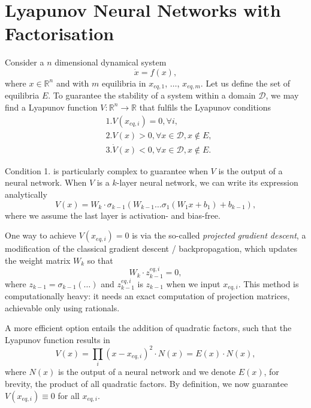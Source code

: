 \documentclass[]{article}
\begin{document}
\section{Lyapunov Neural Networks with Factorisation}
\label{sec:factorisation}

Consider a $n$ dimensional dynamical system 
\begin{equation}
\dot{x} = f(x),
\end{equation}
where $x \in \mathbb{R}^n$ and
with $m$ equilibria in $x_{eq, 1}$, $\dots$, $x_{eq, m}$. Let us define the set of equilibria $E$.
To guarantee the stability of a system within a domain $\mathcal{D}$,  we may find a Lyapunov function $V : \mathbb{R}^n \rightarrow \mathbb{R}$ that fulfils the Lyapunov conditions 
\begin{eqnarray}
& 1. V(x_{eq, i}) = 0,  \forall i, 
\\
& 2. V(x) > 0, \forall x \in \mathcal{D}, x \notin E, 
\\ 
& 3. \dot{V}(x) < 0, \forall x \in \mathcal{D}, x \notin E. 
\end{eqnarray}

Condition 1. is particularly complex to guarantee when $V$ is the output of a neural network. 
%
When $V$ is a $k$-layer neural network, we can write its expression analytically
\begin{equation}
V(x) = W_k \cdot \sigma_{k-1}( W_{k-1} \dots \sigma_1( W_1 x + b_1) + b_{k-1}), 
\end{equation}
where we assume the last layer is activation- and bias-free.

One way to achieve $V(x_{eq, i}) = 0$ is 
via the so-called {\it projected gradient descent}, a modification of the classical gradient descent / backpropagation, 
which updates the weight matrix $W_k$ so that 
\begin{equation}
W_k \cdot z_{k-1}^{eq, i} = 0, 
\end{equation}
where $z_{k-1} = \sigma_{k-1}(\dots)$ and $z_{k-1}^{eq, i}$ is $z_{k-1}$ when we input $x_{eq, i}$.
%
This method is computationally heavy: it needs an exact computation of projection matrices, achievable only using rationals. 

A more efficient option entails the addition of quadratic factors, such that the Lyapunov function results in 
\begin{equation}
V(x) = \prod_i (x - x_{eq, i})^2 \cdot N(x) = E(x) \cdot N(x), 
\end{equation}
where $N(x)$ is the output of a neural network and we denote $E(x)$, for brevity, the product of all quadratic factors.
By definition, we now guarantee $V(x_{eq, i}) \equiv 0$ for all $x_{eq, i}$.
\end{document}
